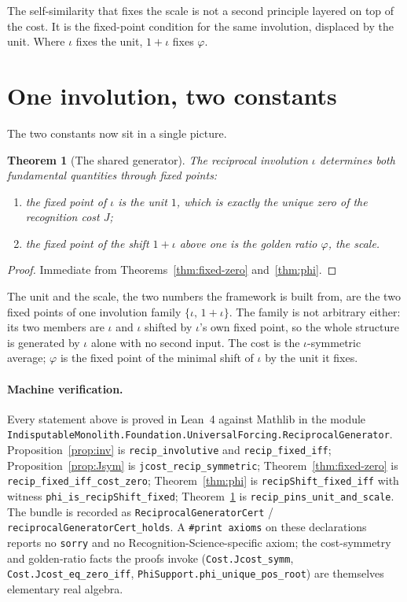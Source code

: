 \documentclass[11pt,a4paper]{article}
\newtheorem{theorem}{Theorem}[section]
\theoremstyle{definition}
\theoremstyle{remark}
\begin{document}
The self-similarity that fixes the scale is not a second principle layered on top
of the cost. It is the fixed-point condition for the same involution, displaced by
the unit. Where $\iota$ fixes the unit, $1+\iota$ fixes $\varphi$.

\section{One involution, two constants}

The two constants now sit in a single picture.

\begin{theorem}[The shared generator]\label{thm:main}
The reciprocal involution $\iota$ determines both fundamental quantities through
fixed points:
\begin{enumerate}[label=\textup{(\roman*)}]
  \item the fixed point of $\iota$ is the unit $1$, which is exactly the unique
    zero of the recognition cost $J$;
  \item the fixed point of the shift $1+\iota$ above one is the golden ratio
    $\varphi$, the scale.
\end{enumerate}
\end{theorem}

\begin{proof}
Immediate from Theorems~\ref{thm:fixed-zero} and~\ref{thm:phi}.
\end{proof}

The unit and the scale, the two numbers the framework is built from, are the two
fixed points of one involution family $\{\iota,\,1+\iota\}$. The family is not
arbitrary either: its two members are $\iota$ and $\iota$ shifted by $\iota$'s own
fixed point, so the whole structure is generated by $\iota$ alone with no second
input. The cost is the $\iota$-symmetric average; $\varphi$ is the fixed point of
the minimal shift of $\iota$ by the unit it fixes.

\paragraph{Machine verification.}
Every statement above is proved in Lean~4 against Mathlib in the module
\texttt{IndisputableMonolith.Foundation.UniversalForcing.ReciprocalGenerator}.
Proposition~\ref{prop:inv} is \texttt{recip\_involutive} and
\texttt{recip\_fixed\_iff}; Proposition~\ref{prop:Jsym} is
\texttt{jcost\_recip\_symmetric}; Theorem~\ref{thm:fixed-zero} is
\texttt{recip\_fixed\_iff\_cost\_zero}; Theorem~\ref{thm:phi} is
\texttt{recipShift\_fixed\_iff} with witness \texttt{phi\_is\_recipShift\_fixed};
Theorem~\ref{thm:main} is \texttt{recip\_pins\_unit\_and\_scale}. The bundle is
recorded as \texttt{ReciprocalGeneratorCert} / \texttt{reciprocalGeneratorCert\_holds}.
A \verb|#print axioms| on these declarations reports no \texttt{sorry} and no
Recognition-Science-specific axiom; the cost-symmetry and golden-ratio facts the
proofs invoke (\texttt{Cost.Jcost\_symm}, \texttt{Cost.Jcost\_eq\_zero\_iff},
\texttt{PhiSupport.phi\_unique\_pos\_root}) are themselves elementary real algebra.
\end{document}
